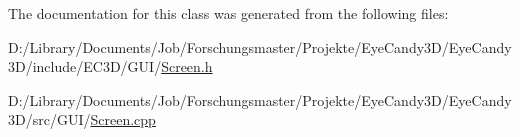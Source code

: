 The documentation for this class was generated from the following files\+:\begin{DoxyCompactItemize}
\item 
D\+:/\+Library/\+Documents/\+Job/\+Forschungsmaster/\+Projekte/\+Eye\+Candy3\+D/\+Eye\+Candy3\+D/include/\+E\+C3\+D/\+G\+U\+I/\mbox{\hyperlink{_screen_8h}{Screen.\+h}}\item 
D\+:/\+Library/\+Documents/\+Job/\+Forschungsmaster/\+Projekte/\+Eye\+Candy3\+D/\+Eye\+Candy3\+D/src/\+G\+U\+I/\mbox{\hyperlink{_screen_8cpp}{Screen.\+cpp}}\end{DoxyCompactItemize}

